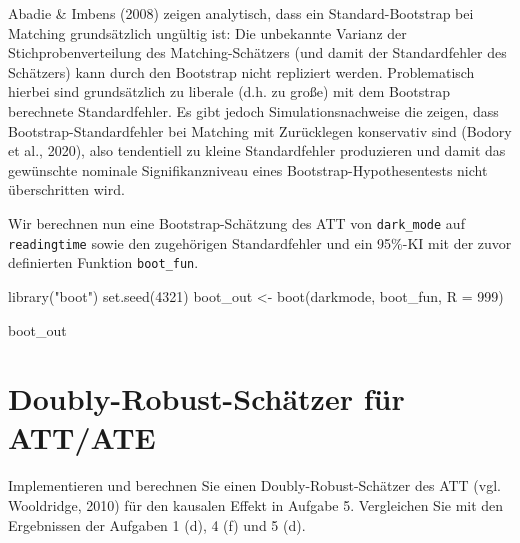 \documentclass[
  a4paper,
  DIV=11,
  oneside]{scrreprt}
\newenvironment{Shaded}{\begin{snugshade}}{\end{snugshade}}
\newcommand{\NormalTok}[1]{\textcolor[rgb]{0.00,0.23,0.31}{#1}}
\begin{document}
Abadie \& Imbens (2008) zeigen analytisch, dass ein Standard-Bootstrap
bei Matching grundsätzlich ungültig ist: Die unbekannte Varianz der
Stichprobenverteilung des Matching-Schätzers (und damit der
Standardfehler des Schätzers) kann durch den Bootstrap nicht repliziert
werden. Problematisch hierbei sind grundsätzlich zu liberale (d.h. zu
große) mit dem Bootstrap berechnete Standardfehler. Es gibt jedoch
Simulationsnachweise die zeigen, dass Bootstrap-Standardfehler bei
Matching mit Zurücklegen konservativ sind (Bodory et al., 2020), also
tendentiell zu kleine Standardfehler produzieren und damit das
gewünschte nominale Signifikanzniveau eines Bootstrap-Hypothesentests
nicht überschritten wird.

Wir berechnen nun eine Bootstrap-Schätzung des ATT von
\texttt{dark\_mode} auf \texttt{readingtime} sowie den zugehörigen
Standardfehler und ein 95\%-KI mit der zuvor definierten Funktion
\texttt{boot\_fun}.

\begin{Shaded}
\begin{Highlighting}[]
\NormalTok{library("boot")}
\NormalTok{set.seed(4321)}
\NormalTok{boot\_out \textless{}{-} boot(darkmode, boot\_fun, R = 999)}

\NormalTok{boot\_out}
\end{Highlighting}
\end{Shaded}

\begin{Shaded}
\end{Shaded}

\hypertarget{doubly-robust-schuxe4tzer-fuxfcr-attate}{%
\section{Doubly-Robust-Schätzer für
ATT/ATE}\label{doubly-robust-schuxe4tzer-fuxfcr-attate}}

Implementieren und berechnen Sie einen Doubly-Robust-Schätzer des ATT
(vgl. Wooldridge, 2010) für den kausalen Effekt in Aufgabe 5.
Vergleichen Sie mit den Ergebnissen der Aufgaben 1 (d), 4 (f) und 5 (d).
\end{document}
